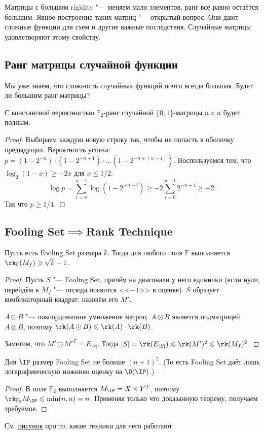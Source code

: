 Матрицы с большим rigidity "--- меняем мало элементов, ранг всё равно остаётся большим. Явное построение таких матриц "--- открытый вопрос. Они дают сложные функции для схем и другие важные последствия. Случайные матрицы удовлетворяют этому свойству.

\subsection{Ранг матрицы случайной функции}
Мы уже знаем, что сложность случайных функций почти всегда большая. Будет ли большим ранг матрицы?

\begin{theorem}
С константной вероятностью $\mathbb{F}_2$-ранг случайной $\{0, 1\}$-матрицы $n\times n$ будет полным.
\end{theorem}
\begin{proof}
Выбираем каждую новую строку так, чтобы не попасть в оболочку предыдущих. Вероятность успеха: $p = (1-2^{-n})\cdot (1-2^{-n+1})\cdot\ldots (1-2^{-n+(n-1)})$.
Воспользуемся тем, что $\log_2(1-x)\geqslant -2x$ для $x\leqslant 1/2$:
$$\log p = \sum_{i=0}^{n-1} \log(1-2^{-n+i})\geqslant -2\sum_{i=0}^{n-1} 2^{-n+i} \geqslant -2.$$
Так что $p\geqslant 1/4$.
\end{proof}

\subsection{Fooling Set\texorpdfstring{$\implies$}{ => }Rank Technique}

\begin{theorem}
Пусть есть Fooling Set размера $k$. Тогда для любого поля $\mathbb{F}$ выполняется $\rk_\mathbb{F}(M_f) \geqslant \sqrt{k} - 1$.
\end{theorem}
\begin{proof}
Пусть $S$ "--- Fooling Set, причём на диагонали у него единички (если нули, перейдём к $\overline{M_f}$ "--- отсюда появится <<$-1$>> в оценке). $S$ образует комбинаторный квадрат, назовём его $M'$. 

$A\odot B$ "--- покоординатное умножение матриц.
$A\odot B$ является подматрицей $A\otimes B$, поэтому $\rk(A\odot B)\leqslant \rk(A)\cdot \rk(B)$.

Заметим, что $M'\odot M'^T = E_{|S|}$. Тогда $|S| = \rk(E_{|S|})\leqslant \rk(M')^2\leqslant \rk(M_f)^2$.
\end{proof}

\begin{corollary}
Для $\IP$ размер Fooling Set не больше $(n+1)^2$. (То есть Fooling Set даёт лишь логарифмическую нижнюю оценку на $\D(\IP)$.)
\end{corollary}
\begin{proof}
В поле $\mathbb{F}_2$ выполняется $M_{\IP} = X\times Y^T$, поэтому $\rk_{\mathbb{F}_2} M_{\IP}\leqslant \min(n, n) = n$. Применяя только что доказанную теорему, получаем требуемое.
\end{proof}

См. \href{https://youtu.be/kmdKu0TYRZ4?t=5654}{рисунок} про то, какие техники для чего работают.